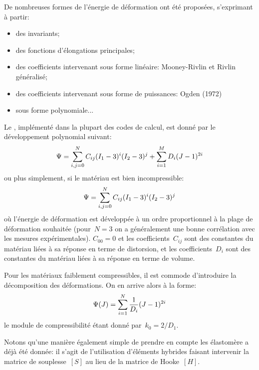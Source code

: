 De nombreuses formes de l'énergie de déformation ont été proposées, s'exprimant à partir:
\begin{itemize}
	\item des invariants;
	\item des fonctions d'élongations principales;
	\item des coefficients intervenant sous forme linéaire: Mooney-Rivlin
	et Rivlin généralisé;
	\item des coefficients intervenant sous forme de puissances: Ogden (1972)
	\item sous forme polynomiale...
\end{itemize}

\medskip
Le , implémenté dans la plupart des codes de calcul, est donné par le développement polynomial suivant:
\begin{equation}
\Psi = \displaystyle\sum\limits_{i,j=0}^N C_{ij}(I_1-3)^i(I_2-3)^j + \displaystyle\sum_{i=1}^M D_i(J-1)^{2i}
\end{equation}
ou plus simplement, si le matériau est bien incompressible:
\begin{equation}
\Psi = \displaystyle\sum\limits_{i,j=0}^N C_{ij}(I_1-3)^i(I_2-3)^j
\end{equation}
où l'énergie de déformation est développée à un ordre proportionnel à la plage de déformation souhaitée (pour~$N=3$ on a généralement une bonne corrélation avec les mesures expérimentales). $C_{00}=0$ et les coefficients~$C_{ij}$ sont des constantes du matériau liées à sa réponse en terme de distorsion, et les coefficients~$D_i$ sont des constantes du matériau liées à sa réponse en terme de volume.

\medskip
Pour les matériaux faiblement compressibles, il est commode d'introduire la décomposition des déformations. On en arrive alors à la forme:
\begin{equation}
\Psi(J) = \displaystyle\sum\limits_{i=1}^N \dfrac1{D_i}(J-1)^{2i}
\end{equation}
le module de compressibilité étant donné par~$k_0=2/D_1$.


\medskip
Notons qu'une manière également simple de prendre en compte les élastomère a déjà été donnée: il s'agit de l'utilisation d'éléments hybrides faisant intervenir la matrice de souplesse~$[S]$ au lieu de la matrice de Hooke~$[H]$.







